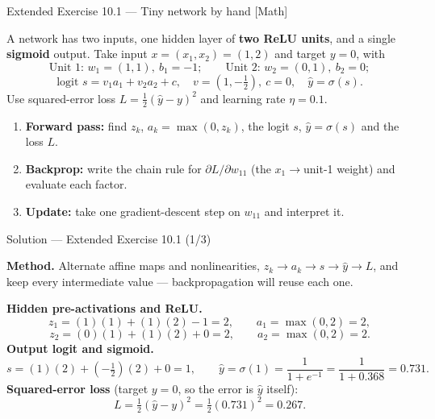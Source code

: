 \documentclass[aspectratio=169,11pt]{beamer}
\begin{document}
\begin{frame}{Extended Exercise 10.1 --- Tiny network by hand [Math]}
\begin{longexercise}
  A network has two inputs, one hidden layer of \textbf{two ReLU units}, and a single
  \textbf{sigmoid} output. Take input $x=(x_1,x_2)=(1,2)$ and target $y=0$, with
  \[
    \text{Unit 1: } w_1=(1,1),\ b_1=-1;\qquad
    \text{Unit 2: } w_2=(0,1),\ b_2=0;
  \]
  \[
    \text{logit } s=v_1a_1+v_2a_2+c,\quad v=(1,-\tfrac12),\ c=0,\quad
    \hat y=\sigma(s).
  \]
  Use squared-error loss $L=\tfrac12(\hat y-y)^2$ and learning rate $\eta=0.1$.
  \begin{enumerate}
    \item \textbf{Forward pass:} find $z_k$, $a_k=\max(0,z_k)$, the logit $s$,
          $\hat y=\sigma(s)$ and the loss $L$.
    \item \textbf{Backprop:} write the chain rule for $\partial L/\partial w_{11}$
          (the $x_1\!\to\!$unit-1 weight) and evaluate each factor.
    \item \textbf{Update:} take one gradient-descent step on $w_{11}$ and interpret it.
  \end{enumerate}
\end{longexercise}
\end{frame}

\begin{frame}{Solution --- Extended Exercise 10.1 (1/3)}
\begin{solutionbox}
  \textbf{Method.} Alternate affine maps and nonlinearities,
  $z_k \to a_k \to s \to \hat y \to L$, and keep every intermediate value ---
  backpropagation will reuse each one.

  \medskip
  \textbf{Hidden pre-activations and ReLU.}
  \[
    z_1=(1)(1)+(1)(2)-1=2,\qquad a_1=\max(0,2)=2,
  \]
  \[
    z_2=(0)(1)+(1)(2)+0=2,\qquad a_2=\max(0,2)=2.
  \]
  \textbf{Output logit and sigmoid.}
  \[
    s=(1)(2)+(-\tfrac12)(2)+0=1,\qquad
    \hat y=\sigma(1)=\frac{1}{1+e^{-1}}=\frac{1}{1+0.368}=0.731 .
  \]
  \textbf{Squared-error loss} (target $y=0$, so the error is $\hat y$ itself):
  \[
    L=\tfrac12(\hat y-y)^2=\tfrac12(0.731)^2=0.267 .
  \]
\end{solutionbox}
\end{frame}
\end{document}
